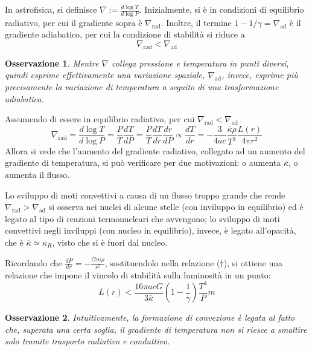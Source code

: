 \documentclass[11pt, a4paper]{scrartcl}
\theoremstyle{style}
\newtheorem{osservazione}{Osservazione}[section]
\theoremstyle{style1}
\numberwithin{equation}{subsection}
\begin{document}
In astrofisica, si definisce $\nabla := \frac{d \log T}{d \log P} $.
Inizialmente, si \`e in condizioni di equilibrio radiativo, per cui il gradiente sopra \`e $\nabla _\text{rad}$.
Inoltre, il termine $1 - 1 / \gamma = \nabla _\text{ad}$ \`e il gradiente adiabatico, per cui la condizione di stabilit\`a si riduce a 
\begin{equation}
	\nabla _\text{rad} < \nabla _\text{ad}
\end{equation}
\begin{osservazione}
Mentre $\nabla$ collega pressione e temperatura in punti diversi, quindi esprime effettivamente una variazione spaziale, $\nabla _\text{ad}$, invece, esprime pi\`u precisamente la variazione di temperatura a seguito di una trasformazione adiabatica.
\end{osservazione}
\noindent Assumendo di essere in equilibrio radiativo, per cui $\nabla _\text{rad}< \nabla _\text{ad}$
\[\tag{\dagger}
\nabla _\text{rad} = \frac{d \log T}{d \log P} = \frac{P}{T} \frac{d T}{d P}  = \frac{P}{T} \frac{d T}{d r}  \frac{d r}{d P} \propto \frac{d T}{d r} = - \frac{3}{4ac}\frac{\overline{\kappa }\rho }{T^3} \frac{L(r)}{4 \pi r^2}
\] 
Allora si vede che l'aumento del gradiente radiativo, collegato ad un aumento del gradiente di temperatura, si pu\`o verificare per due motivazioni: o aumenta $\overline{\kappa }$, o aumenta il flusso.

Lo sviluppo di moti convettivi a causa di un flusso troppo grande che rende $\nabla _\text{rad} > \nabla _\text{ad}$ si osserva nei nuclei di alcune stelle (con inviluppo in equilibrio) ed \`e legato al tipo di reazioni termonucleari che avvengono; lo sviluppo di moti convettivi negli inviluppi (con nucleo in equilibrio), invece, \`e legato all'opacit\`a, che \`e $\overline{\kappa }\simeq \kappa _R$, visto che si \`e fuori dal nucleo.

Ricordando che $\frac{d P}{d r} = - \frac{Gm \rho }{r^2}$, sostituendolo nella relazione ($\dagger$), si ottiene una relazione che impone il vincolo di stabilit\`a sulla luminosit\`a in un punto:
\begin{equation}
	L(r) < \frac{16 \pi ac G}{3 \overline{\kappa }} \left(1- \frac{1}{\gamma}\right) \frac{T^4}{P}m
\end{equation}
\begin{osservazione}
Intuitivamente, la formazione di convezione \`e legata al fatto che, superata una certa soglia, il gradiente di temperatura non si riesce a \textit{smaltire} solo tramite trasporto radiativo e conduttivo.
\end{osservazione}
\end{document}

